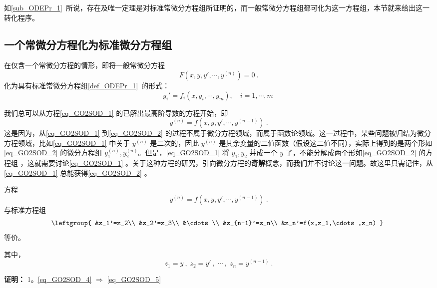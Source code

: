 
如\autoref{sub_ODEPr_1}~所说，存在及唯一定理是对标准常微分方程组所证明的，而一般常微分方程组都可化为这一方程组，本节就来给出这一转化程序。

\subsection{一个常微分方程化为标准微分方程组}
在仅含一个常微分方程的情形，即将一般常微分方程
\begin{equation}\label{eq_GO2SOD_1}
F(x,y,y',\cdots,y^{(n)})=0~.
\end{equation}
化为具有标准常微分方程组\autoref{def_ODEPr_1}~的形式：
\begin{equation}\label{eq_GO2SOD_3}
y_i'=f_i(x,y_i,\cdots,y_m),\quad i=1,\cdots,m~
\end{equation}

我们总可以从方程\autoref{eq_GO2SOD_1} 的已解出最高阶导数的方程开始，即
\begin{equation}\label{eq_GO2SOD_2}
y^{(n)}=f(x,y,y',\cdots,y^{(n-1)})~.
\end{equation}
这是因为，从\autoref{eq_GO2SOD_1} 到\autoref{eq_GO2SOD_2} 的过程不属于微分方程领域，而属于函数论领域。这一过程中，某些问题被归结为微分方程领域，比如\autoref{eq_GO2SOD_1} 中关于 $y^{(n)}$ 是二次的，因此 $y^{(n)}$ 是其余变量的二值函数（假设这二值不同），实际上得到的是两个形如\autoref{eq_GO2SOD_2} 的微分方程组 $y_1^{(n)},y_2^{(n)}$。但是，\autoref{eq_GO2SOD_1} 将 $y_1,y_2$ 并成一个 $y$ 了，不能分解成两个形如\autoref{eq_GO2SOD_2} 的方程组 ，这就需要讨论\autoref{eq_GO2SOD_1} 。关于这种方程的研究，引向微分方程的\textbf{奇解}概念，而我们并不讨论这一问题。故这里只需记住，从\autoref{eq_GO2SOD_1} 总能获得\autoref{eq_GO2SOD_2} 。
\begin{theorem}{}\label{the_GO2SOD_1}
方程
\begin{equation}\label{eq_GO2SOD_4}
y^{(n)}=f(x,y,y',\cdots,y^{(n-1)})~.
\end{equation}
与标准方程组
\begin{equation}\label{eq_GO2SOD_5}
\leftgroup{
&z_1'=z_2\\
&z_2'=z_3\\
&\cdots\\
&z_{n-1}'=z_n\\
&z_n'=f(x,z_1,\cdots,z_n)
}~
\end{equation}
等价。

其中，
\begin{equation}\label{eq_GO2SOD_6}
z_1=y~,\;z_2=y'~,\;\cdots~,\;z_n=y^{(n-1)}~.
\end{equation}
\end{theorem}
\textbf{证明：}
1。\autoref{eq_GO2SOD_4} $\Rightarrow$ \autoref{eq_GO2SOD_5} 

